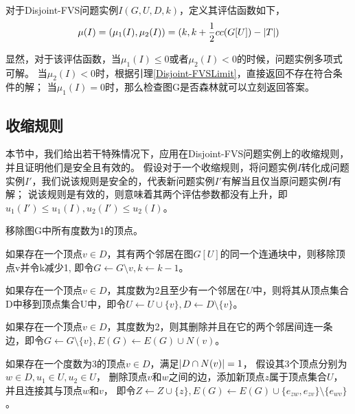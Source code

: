 \begin{definition}
对于Disjoint-FVS问题实例$I(G, U, D, k)$，定义其评估函数如下，
\[\mu(I) = (\mu_1(I), \mu_2(I)) = (k, k + \frac{1}{2}cc(G[U]) - \left\vert T \right\vert)\]
\end{definition}

显然，对于该评估函数，当$\mu_1(I) \le  0$或者$\mu_2(I) < 0$的时候，问题实例多项式可解。
当$\mu_2(I) < 0$时，根据引理\ref{Disjoint-FVSLimit}，直接返回不存在符合条件的解；
当$\mu_1(I) = 0$时，那么检查图G是否森林就可以立刻返回答案。

\subsection{收缩规则}
本节中，我们给出若干特殊情况下，应用在Disjoint-FVS问题实例上的收缩规则，并且证明他们是安全且有效的。
假设对于一个收缩规则，将问题实例$I$转化成问题实例$I'$，我们说该规则是安全的，代表新问题实例$I'$有解当且仅当原问题实例$I$有解；
说该规则是有效的，则意味着其两个评估参数都没有上升，即$u_1(I') \le u_1(I), u_2(I') \le u_2(I)$。 \\

\begin{reducerule}
移除图G中所有度数为1的顶点。
\end{reducerule}

\begin{reducerule}
如果存在一个顶点$v \in D$，其有两个邻居在图$G[U]$的同一个连通块中，则移除顶点v并令k减少1, 即令$G \leftarrow G \setminus v, k \leftarrow k - 1$。
\end{reducerule}

\begin{reducerule}
如果存在一个顶点$v \in D$，其度数为2且至少有一个邻居在$U$中，则将其从顶点集合D中移到顶点集合U中，即令$U \leftarrow U \cup \{v\}, D \leftarrow D \setminus \{v\}$。
\end{reducerule}

\begin{reducerule}
如果存在一个顶点$v \in D$，其度数为2，则其删除并且在它的两个邻居间连一条边，即令$G \leftarrow G \setminus \{v\}, E(G) \leftarrow E(G) \cup N(v)$。
\end{reducerule}


\begin{reducerule}
如果存在一个度数为3的顶点$v \in D$，满足$\left\vert D \cap N(v) \right\vert = 1$，
假设其3个顶点分别为$w \in D, u_1 \in U, u_2 \in U$，
删除顶点$v$和$w$之间的边，添加新顶点$z$属于顶点集合$U$，并且连接其与顶点$w$和$v$，
即令$Z \leftarrow Z \cup \{z\}, E(G) \leftarrow E(G) \cup \{e_{zw}, e_{zv}\} \setminus \{e_{wv}\}$。
\end{reducerule}


